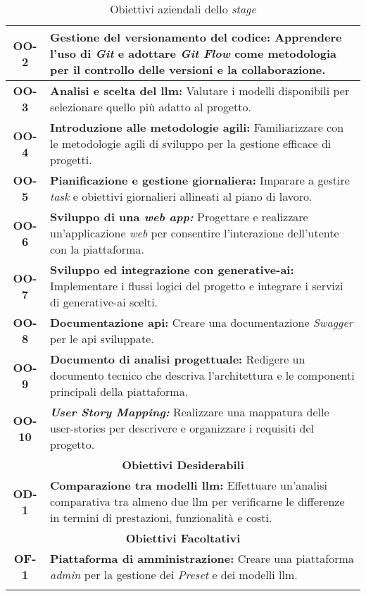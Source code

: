 \begin{longtable}{|c|>{\centering\arraybackslash}p{}|}
    \hline
    \textbf{OO-2} & \textbf{Gestione del versionamento del codice:} Apprendere l'uso di \textit{Git} e adottare \textit{Git Flow} come metodologia per il controllo delle versioni e la collaborazione. \\
    \hline
    \textbf{OO-3} & \textbf{Analisi e scelta del \gls{llm}:} Valutare i modelli disponibili per selezionare quello più adatto al progetto. \\
    \hline
    \textbf{OO-4} & \textbf{Introduzione alle metodologie agili:} Familiarizzare con le metodologie agili di sviluppo per la gestione efficace di progetti. \\
    \hline
    \textbf{OO-5} & \textbf{Pianificazione e gestione giornaliera:} Imparare a gestire \textit{task} e obiettivi giornalieri allineati al piano di lavoro. \\
    \hline
    \textbf{OO-6} & \textbf{Sviluppo di una \textit{web app:}} Progettare e realizzare un'applicazione \textit{web} per consentire l'interazione dell'utente con la piattaforma. \\
    \hline
    \textbf{OO-7} & \textbf{Sviluppo ed integrazione con \gls{generative-ai}:} Implementare i flussi logici del progetto e integrare i servizi di \gls{generative-ai} scelti. \\
    \hline
    \textbf{OO-8} & \textbf{Documentazione \gls{api}:} Creare una documentazione \textit{Swagger} per le \gls{api} sviluppate. \\
    \hline
    \textbf{OO-9} & \textbf{Documento di analisi progettuale:} Redigere un documento tecnico che descriva l'architettura e le componenti principali della piattaforma. \\
    \hline
    \textbf{OO-10} & \textbf{\textit{User Story Mapping:}} Realizzare una mappatura delle \gls{user-stories} per descrivere e organizzare i requisiti del progetto. \\
    \hline
    \multicolumn{2}{|c|}{\rowcolor{green!30} \textbf{Obiettivi Desiderabili}} \\
    \hline %
    \textbf{OD-1} & \textbf{Comparazione tra modelli \gls{llm}:} Effettuare un'analisi comparativa tra almeno due \gls{llm} per verificarne le differenze in termini di prestazioni, funzionalità e costi. \\
    \hline
    \multicolumn{2}{|c|}{\rowcolor{green!30} \textbf{Obiettivi Facoltativi}} \\
    \noalign{\hrule} %
    \textbf{OF-1} & \textbf{Piattaforma di amministrazione:} Creare una piattaforma \textit{admin} per la gestione dei \textit{Preset} e dei modelli \gls{llm}. \\
    \hline
    \caption{Obiettivi aziendali dello \textit{stage}} %
    \label{tab:obiettivi_stage} %
\end{longtable}

